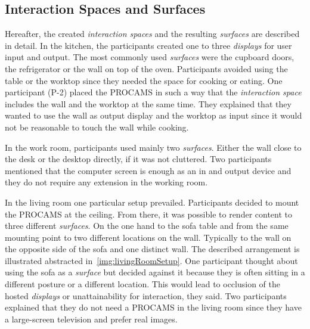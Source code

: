 \subsection{Interaction Spaces and Surfaces}
Hereafter, the created \emph{interaction spaces} and the resulting \emph{surfaces} are described in detail.
In the kitchen, the participants created one to three \emph{displays} for user input and output. The most commonly used \emph{surfaces} were the cupboard doors, the refrigerator or the wall on top of the oven. Participants avoided using the table or the worktop since they needed the space for cooking or eating. One participant (P-2) placed the \ac{PROCAMS} in such a way that the \emph{interaction space} includes the wall and the worktop at the same time. They explained that they wanted to use the wall as output display and the worktop as input since it would not be reasonable to touch the wall while cooking.

In the work room, participants used mainly two \emph{surfaces}. Either the wall close to the desk or the desktop directly, if it was not cluttered. Two participants mentioned that the computer screen is enough as an in and output device and they do not require any extension in the working room. 

In the living room one particular setup prevailed. Participants decided to mount the \ac{PROCAMS} at the ceiling. From there, it was possible to render content to three different \emph{surfaces}. On the one hand to the sofa table and from the same mounting point to two different locations on the wall. Typically to the wall on the opposite side of the sofa and one distinct wall. The described arrangement is illustrated abstracted in~\autoref{img:livingRoomSetup}. One participant thought about using the sofa as a \emph{surface} but decided against it because they is often sitting in a different posture or a different location. This would lead to occlusion of the hosted \emph{displays} or unattainability for interaction, they said. Two participants explained that they do not need a \ac{PROCAMS} in the living room since they have a large-screen television and prefer real images.

